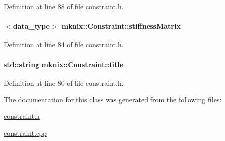 Definition at line 88 of file constraint.\+h.

\hypertarget{classmknix_1_1_constraint_ab4b508cdbea36124b925f52525a1d5ad}{}
\paragraph[{stiffness\+Matrix}]{$<${\bf data\+\_\+type}$>$ mknix\+::\+Constraint\+::stiffness\+Matrix\hspace{0.3cm}{\ttfamily [protected]}}\label{classmknix_1_1_constraint_ab4b508cdbea36124b925f52525a1d5ad}


Definition at line 84 of file constraint.\+h.

\hypertarget{classmknix_1_1_constraint_ae245e7947a6ae56d5d0c42b31059af72}{}
\paragraph[{title}]{\setlength{\rightskip}{0pt plus 5cm}std\+::string mknix\+::\+Constraint\+::title\hspace{0.3cm}{\ttfamily [protected]}}\label{classmknix_1_1_constraint_ae245e7947a6ae56d5d0c42b31059af72}


Definition at line 80 of file constraint.\+h.



The documentation for this class was generated from the following files\+:\begin{DoxyCompactItemize}
\item 
\hyperlink{constraint_8h}{constraint.\+h}\item 
\hyperlink{constraint_8cpp}{constraint.\+cpp}\end{DoxyCompactItemize}
